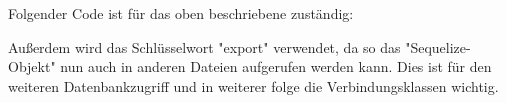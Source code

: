 Folgender Code ist für das oben beschriebene zuständig:


Außerdem wird das Schlüsselwort "export" verwendet, da so das "Sequelize-Objekt" nun auch in anderen Dateien aufgerufen werden kann. Dies ist für den weiteren Datenbankzugriff und in weiterer folge die Verbindungsklassen wichtig.




